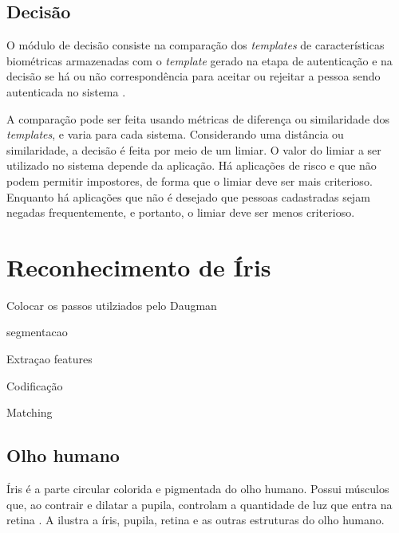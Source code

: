 \subsection{Decisão} \label{sec:sis_bio:decisao}

\par O módulo de decisão consiste na comparação dos \textit{templates} de características biométricas armazenadas com o \textit{template} gerado na etapa de autenticação e na decisão se há ou não correspondência para aceitar ou rejeitar a pessoa sendo autenticada no sistema \cite{wayman2005biometric}.

\par A comparação pode ser feita usando métricas de diferença ou similaridade dos \textit{templates}, e varia para cada sistema. Considerando uma distância ou similaridade, a decisão é feita por meio de um limiar. O valor do limiar a ser utilizado no sistema depende da aplicação. Há aplicações de risco e que não podem permitir impostores, de forma que o limiar deve ser mais criterioso. Enquanto há aplicações que não é desejado que pessoas cadastradas sejam negadas frequentemente, e portanto, o limiar deve ser menos criterioso.

\section{Reconhecimento de Íris}

\par Colocar os passos utilziados pelo Daugman \cite{daugman2004}

\par segmentacao

\par Extraçao features

\par Codificação

\par Matching

\subsection{Olho humano}\label{sec:iris:olho}

\par Íris é a parte circular colorida e pigmentada do olho humano. Possui músculos que, ao contrair e dilatar a pupila, controlam a quantidade de luz que entra na retina \cite{adlerIris2003}. A  ilustra a íris, pupila, retina e as outras estruturas do olho humano.

